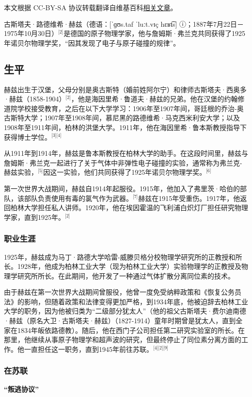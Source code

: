 
本文根据 CC-BY-SA 协议转载翻译自维基百科\href{https://en.wikipedia.org/wiki/Gustav_Ludwig_Hertz}{相关文章}。

古斯塔夫·路德维希·赫兹（德语：[ˈɡʊs.taf ˈluːt.vɪç hɛʁt͡s] ⓘ；1887年7月22日－1975年10月30日）\(^\text{[2]}\)是德国的原子物理学家，他与詹姆斯·弗兰克共同获得了1925年诺贝尔物理学奖，“因其发现了电子与原子碰撞的规律”。
\subsection{生平}
赫兹出生于汉堡，父母分别是奥古斯特（婚前姓阿尔宁）和律师古斯塔夫·西奥多·赫兹（1858-1904）\(^\text{[2]}\)，他是海因里希·鲁道夫·赫兹的兄弟。他在汉堡的约翰修道院学校接受教育，之后在以下大学学习：1906年至1907年间，哥廷根的乔治-奥古斯特大学；1907年至1908年间，慕尼黑的路德维希·马克西米利安大学；以及1908年至1911年间，柏林的洪堡大学。1911年，他在海因里希·鲁本斯教授指导下获得博士学位。\(^\text{[3][4]}\)

从1911年到1914年，赫兹是鲁本斯教授在柏林大学的助手。在这段时间里，赫兹与詹姆斯·弗兰克一起进行了关于气体中非弹性电子碰撞的实验，通常称为弗兰克-赫兹实验，\(^\text{[5]}\)因这一实验，他们共同获得了1925年诺贝尔物理学奖。\(^\text{[6]}\)

第一次世界大战期间，赫兹自1914年起服役。1915年，他加入了弗里茨·哈伯的部队，该部队负责使用有毒的氯气作为武器。\(^\text{[7]}\)赫兹在1915年受重伤。1917年，他返回柏林大学担任私人讲师。1920年，他在埃因霍温的飞利浦白炽灯厂担任研究物理学家，直到1925年。\(^\text{[2]}\)
\subsubsection{职业生涯}
1925年，赫兹成为马丁·路德大学哈雷-威滕贝格分校物理学研究所的正教授和所长。1928年，他成为柏林工业大学（现为柏林工业大学）实验物理学的正教授及物理学研究所所长。在此期间，他开发了一种通过气体扩散分离同位素的技术。

由于赫兹在第一次世界大战期间曾服役，他曾一度免受纳粹政策和《恢复公务员法》的影响，但随着政策和法律变得更加严格，到1934年底，他被迫辞去柏林工业大学的职务，因为他被归类为“二级部分犹太人”（他的祖父古斯塔夫·费尔迪南德·赫兹（原名大卫·古斯塔夫·赫兹）（1827-1914）童年时期曾是犹太人，直到全家在1834年皈依路德教）。随后，他在西门子公司担任第二研究实验室的所长。在那里，他继续从事原子物理学和超声波的研究，但最终停止了同位素分离方面的工作。他一直担任这一职务，直到1945年前往苏联。\(^\text{[4][2][9]}\)
\subsubsection{在苏联}
\textbf{“叛逃协议”}

